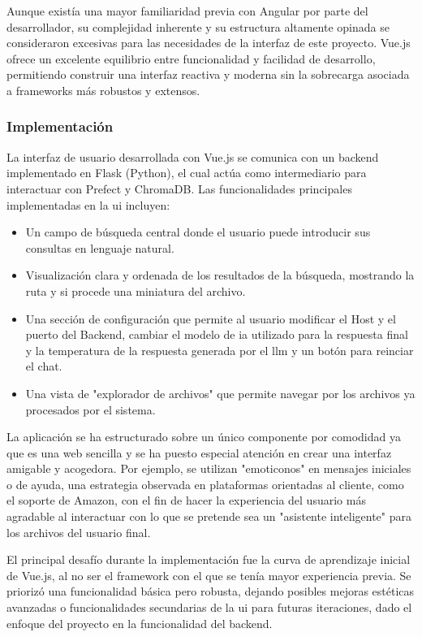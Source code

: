 Aunque existía una mayor familiaridad previa con Angular por parte del desarrollador, su complejidad inherente y su estructura altamente opinada se consideraron excesivas para las necesidades de la interfaz de este proyecto. Vue.js ofrece un excelente equilibrio entre funcionalidad y facilidad de desarrollo, permitiendo construir una interfaz reactiva y moderna sin la sobrecarga asociada a frameworks más robustos y extensos.

\subsubsection{Implementación}
La interfaz de usuario desarrollada con Vue.js se comunica con un backend implementado en Flask (Python), el cual actúa como intermediario para interactuar con Prefect y ChromaDB. Las funcionalidades principales implementadas en la \gls{ui} incluyen:
\begin{itemize}
    \item Un campo de búsqueda central donde el usuario puede introducir sus consultas en lenguaje natural.
    \item Visualización clara y ordenada de los resultados de la búsqueda, mostrando la ruta y si procede una miniatura del archivo.
    \item Una sección de configuración que permite al usuario modificar el Host y el puerto del Backend, cambiar el modelo de \gls{ia} utilizado para la respuesta final y la temperatura de la respuesta generada por el \gls{llm} y un botón para reinciar el chat.
    \item Una vista de "explorador de archivos" que permite navegar por los archivos ya procesados por el sistema.
\end{itemize}
La aplicación se ha estructurado sobre un único componente por comodidad ya que es una web sencilla y se ha puesto especial atención en crear una interfaz amigable y acogedora. Por ejemplo, se utilizan "emoticonos" en mensajes iniciales o de ayuda, una estrategia observada en plataformas orientadas al cliente, como el soporte de Amazon, con el fin de hacer la experiencia del usuario más agradable al interactuar con lo que se pretende sea un "asistente inteligente" para los archivos del usuario final.

El principal desafío durante la implementación fue la curva de aprendizaje inicial de Vue.js, al no ser el framework con el que se tenía mayor experiencia previa. Se priorizó una funcionalidad básica pero robusta, dejando posibles mejoras estéticas avanzadas o funcionalidades secundarias de la \gls{ui} para futuras iteraciones, dado el enfoque del proyecto en la funcionalidad del backend.

